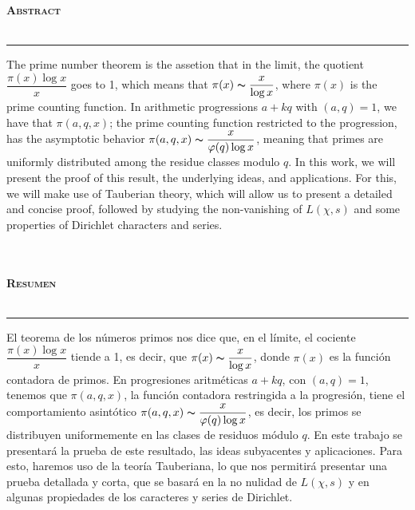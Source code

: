
\thispagestyle{empty}
\vspace*{4cm}
\begin{Huge}
    \bfseries \selectfont \hfill \scshape Abstract\\\\
    \rule[0.5ex]{\linewidth}{1pt}
\end{Huge}

The prime number theorem is the assetion that in the limit, the quotient $\dfrac{\pi(x)\log x}{x}$ goes to 1, which means that $\pi(x)\thicksim \dfrac{x}{\log x}$, where $\pi(x)$ is the prime counting function. In arithmetic progressions $a+kq$ with $(a,q)=1$, we have that $\pi(a,q,x)$; the prime counting function restricted to the progression, has the asymptotic behavior $\pi(a,q,x)\thicksim \dfrac{x}{\phi(q)\log x}$, meaning that primes are uniformly distributed among the residue classes modulo $q$. In this work, we will present the proof of this result, the underlying ideas, and applications. For this, we will make use of Tauberian theory, which will allow us to present a detailed and concise proof, followed by studying the non-vanishing of $L(\chi,s)$ and some properties of Dirichlet characters and series.\\\\\\

\begin{Huge}
    \bfseries \selectfont \scshape Resumen\\\\
    \rule[0.5ex]{\linewidth}{1pt}
\end{Huge}

El teorema de los números primos nos dice que, en el límite, el cociente $\dfrac{\pi(x)\log x}{x}$ tiende a 1, es decir, que $\pi(x)\thicksim \dfrac{x}{\log x}$, donde $\pi(x)$ es la función contadora de primos. En progresiones aritméticas $a+kq$, con $(a,q)=1$, tenemos que $\pi(a,q,x)$, la función contadora restringida a la progresión, tiene el comportamiento asintótico $\pi(a,q,x)\thicksim \dfrac{x}{\phi(q)\log x}$, es decir, los primos se distribuyen uniformemente en las clases de residuos módulo $q$. En este trabajo se presentará la prueba de este resultado, las ideas subyacentes y aplicaciones. Para esto, haremos uso de la teoría Tauberiana, lo que nos permitirá presentar una prueba detallada y corta, que se basará en la no nulidad de $L(\chi,s)$ y en algunas propiedades de los caracteres y series de Dirichlet.

